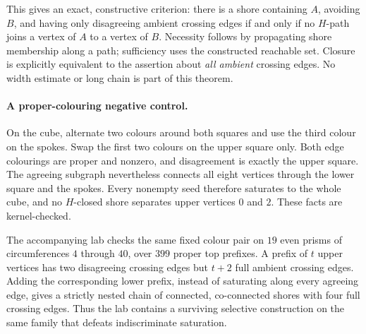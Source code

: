 This gives an exact, constructive criterion: there is a shore containing
$A$, avoiding $B$, and having only disagreeing ambient crossing edges
if and only if no $H$-path joins a vertex of $A$ to a vertex of $B$.
Necessity follows by propagating shore membership along a path;
sufficiency uses the constructed reachable set. Closure is explicitly
equivalent to the assertion about \emph{all ambient} crossing edges.
No width estimate or long chain is part of this theorem.

\paragraph{A proper-colouring negative control.}
On the cube, alternate two colours around both squares and use the third
colour on the spokes. Swap the first two colours on the upper square
only. Both edge colourings are proper and nonzero, and disagreement is
exactly the upper square. The agreeing subgraph nevertheless connects all
eight vertices through the lower square and the spokes. Every nonempty
seed therefore saturates to the whole cube, and no $H$-closed shore
separates upper vertices $0$ and $2$. These facts are kernel-checked.

The accompanying lab checks the same fixed colour pair on $19$ even
prisms of circumferences $4$ through $40$, over $399$ proper top prefixes.
A prefix of $t$ upper vertices has two disagreeing crossing edges but
$t+2$ full ambient crossing edges. Adding the corresponding lower prefix,
instead of saturating along every agreeing edge, gives a strictly nested
chain of connected, co-connected shores with four full crossing edges.
Thus the lab contains a surviving selective construction on the same
family that defeats indiscriminate saturation.

